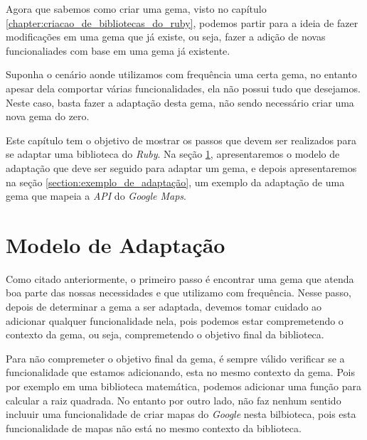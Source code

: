 Agora que sabemos como criar uma gema, visto no capítulo \ref{chapter:criacao_de_bibliotecas_do_ruby},
podemos partir para a ideia de fazer modificações em uma gema que já existe, ou seja, fazer a adição
de novas funcionaliades com base em uma gema já existente.

Suponha o cenário aonde utilizamos com frequência uma certa gema, no entanto apesar dela comportar várias 
funcionalidades, ela não possui tudo que desejamos. Neste caso, basta fazer a adaptação desta gema, não 
sendo necessário criar uma nova gema do zero.

Este capítulo tem o objetivo de mostrar os passos que devem ser realizados para se adaptar uma
biblioteca do \emph{Ruby}. Na seção \ref{section:modelo_de_adaptação}, apresentaremos o modelo de adaptação
que deve ser seguido para adaptar um gema, e depois apresentaremos na seção \ref{section:exemplo_de_adaptação},
um exemplo da adaptação de uma gema que mapeia a \emph{API} do \emph{Google Maps}.

\section{Modelo de Adaptação}
\label{section:modelo_de_adaptação}


Como citado anteriormente, o primeiro passo é encontrar uma gema que atenda boa parte das nossas
necessidades e que utilizamo com frequência. Nesse passo, depois de determinar a gema a ser adaptada,
devemos tomar cuidado ao adicionar qualquer funcionalidade nela, pois podemos estar compremetendo o
contexto da gema, ou seja, compremetendo o objetivo final da biblioteca.

Para não compremeter o objetivo final da gema, é sempre válido verificar se a funcionalidade
que estamos adicionando, esta no mesmo contexto da gema. Pois por exemplo em uma biblioteca matemática,
podemos adicionar uma função para calcular a raiz quadrada. No entanto por outro lado,
não faz nenhum sentido incluuir uma funcionalidade de criar mapas do \emph{Google} nesta bilbioteca,
pois esta funcionalidade de mapas não está no mesmo contexto da biblioteca.

